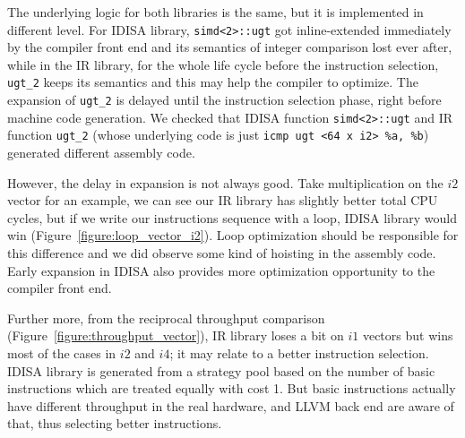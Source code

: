 The underlying logic for both libraries is the same, but it is implemented in different level. For IDISA library, {\tt simd<2>::ugt} got inline-extended immediately by the compiler front end and its semantics of integer comparison lost ever after, while in the IR library, for the whole life cycle before the instruction selection, {\tt ugt\_2} keeps its semantics and this may help the compiler to optimize. The expansion of {\tt ugt\_2} is delayed until the instruction selection phase, right before machine code generation. We checked that IDISA function {\tt simd<2>::ugt} and IR function {\tt ugt\_2} (whose underlying code is just \verb|icmp ugt <64 x i2> %a, %b|) generated different assembly code.

However, the delay in expansion is not always good. Take multiplication on the $i2$ vector for an example, we can see our IR library has slightly better total CPU cycles, but if we write our instructions sequence with a loop, IDISA library would win (Figure~\ref{figure:loop_vector_i2}). Loop optimization should be responsible for this difference and we did observe some kind of hoisting in the assembly code. Early expansion in IDISA also provides more optimization opportunity to the compiler front end.

Further more, from the reciprocal throughput comparison (Figure~\ref{figure:throughput_vector}), IR library loses a bit on $i1$ vectors but wins most of the cases in $i2$ and $i4$; it may relate to a better instruction selection. IDISA library is generated from a strategy pool based on the number of basic instructions which are treated equally with cost 1. But basic instructions actually have different throughput in the real hardware, and LLVM back end are aware of that, thus selecting better instructions.

